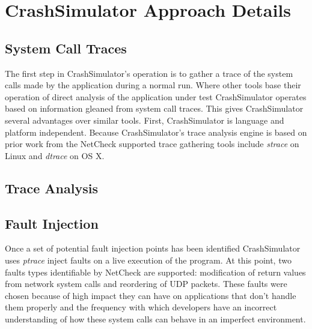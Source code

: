 \section{CrashSimulator Approach Details}

    \subsection{System Call Traces}

    The first step in CrashSimulator's operation is to gather a trace of the system
    calls made by the application during a normal run. Where other tools base their operation of direct analysis of the
    application under test CrashSimulator operates based on information gleaned from system call traces. This gives
    CrashSimulator several advantages over similar tools. First, CrashSimulator is language and platform independent.
    Because CrashSimulator's trace analysis engine is based on prior work from the NetCheck supported trace gathering
    tools include \emph{strace} on Linux and \emph{dtrace} on OS X.

    \subsection{Trace Analysis}



    \subsection{Fault Injection}

     Once a set of potential fault injection points has been identified CrashSimulator uses
    \emph{ptrace} inject faults on a live execution of the program. At this point, two faults types identifiable by
    NetCheck are supported: modification of return values from network system calls and reordering of UDP packets.
    These faults were chosen because of high impact they can have on applications that don't handle them properly and
    the frequency with which developers have an incorrect understanding of how these system calls can behave in an
    imperfect environment.

